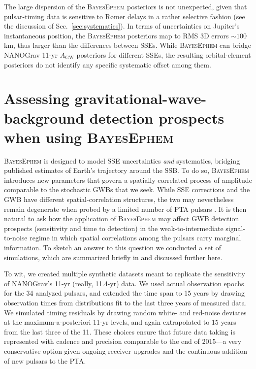 \documentclass{aastex63}
\begin{document}
The large dispersion of the \textsc{BayesEphem} posteriors is not unexpected, given that pulsar-timing data is sensitive to R{\o}mer delays in a rather selective fashion (see the discussion of Sec.\ \ref{sec:systematics}).
In terms of uncertainties on Jupiter's instantaneous position, the \textsc{BayesEphem} posteriors map to RMS 3D errors $\sim 100$ km, thus larger than the differences between SSEs. While \textsc{BayesEphem} can bridge NANOGrav 11-yr $A_\mathrm{GW}$ posteriors for different SSEs, the resulting orbital-element posteriors %
do not identify any specific systematic offset among them.

\section{Assessing gravitational-wave-background detection prospects when using \textsc{BayesEphem}}
\label{sec:simulations}

\textsc{BayesEphem} is designed to model SSE uncertainties \emph{and} systematics, bridging published estimates of Earth's trajectory around the SSB.
To do so, \textsc{BayesEphem} introduces new parameters that govern a spatially correlated process of amplitude comparable to the stochastic GWBs that we seek.
While SSE corrections and the GWB have different spatial-correlation structures, the two may nevertheless remain degenerate when probed by a limited number of PTA pulsars \citep{2019ApJ...876...55R}.
It is then natural to ask how the application of \textsc{BayesEphem} may affect GWB detection prospects (sensitivity and time to detection) in the weak-to-intermediate signal-to-noise regime in which spatial correlations among the pulsars carry marginal information.
To sketch an answer to this question we conducted a set of simulations, which are summarized briefly in \cite{2018ApJ...859...47A} and discussed further here.

To wit, we created multiple synthetic datasets meant to replicate the sensitivity of NANOGrav's 11-yr (really, 11.4-yr) data. We used actual observation epochs for the 34 analyzed pulsars, and extended the time span to 15 years by drawing observation times from distributions fit to the last three years of measured data.
We simulated timing residuals by drawing random white- and red-noise deviates at the maximum-a-posteriori 11-yr levels, and again extrapolated to 15 years from the last three of the 11.
These choices ensure that future data taking is represented with cadence and precision comparable to the end of 2015---a very conservative option given ongoing receiver upgrades and the continuous addition of new pulsars to the PTA.
\end{document}
